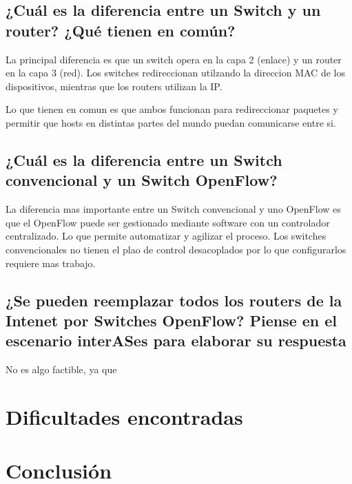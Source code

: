 \documentclass{article}
\begin{document}
\subsection{\texorpdfstring{\textbf{¿Cuál es la diferencia entre un Switch y un router? ¿Qué tienen en común?}}{1. ¿Cuál es la diferencia entre un Switch y un router? ¿Qué tienen en común?}}\label{describa-la-arquitectura-cliente-servidor.}

La principal diferencia es que un switch opera en la capa 2 (enlace) y un router en la capa 3 (red).
Los switches redireccionan utilzando la direccion MAC de los dispositivos, mientras que los
routers utilizan la IP.

Lo que tienen en comun es que ambos funcionan para redireccionar paquetes y permitir
que hosts en distintas partes del mundo puedan comunicarse entre si.

\subsection{\texorpdfstring{\textbf{¿Cuál es la diferencia entre un Switch convencional y un Switch OpenFlow?}}{¿Cuál es la diferencia entre un Switch convencional y un Switch OpenFlow?}}\label{detalle-el-protocolo-de-aplicaciuxf3n-desarrollado-en-este-trabajo.}

La diferencia mas importante entre un Switch convencional y uno OpenFlow es que el OpenFlow puede
ser gestionado mediante software con un controlador centralizado. Lo que permite automatizar
y agilizar el proceso.
Los switches convencionales no tienen el plao de control desacoplados por lo que configurarlos
requiere mas trabajo.

\subsection{\texorpdfstring{\textbf{¿Se pueden reemplazar todos los routers de la Intenet por Switches OpenFlow? Piense en el escenario interASes para elaborar su respuesta}}{¿Se pueden reemplazar todos los routers de la Intenet por Switches OpenFlow? Piense en el escenario interASes para elaborar su respuesta}}\label{la-capa-de-transporte-del-stack-tcpip-ofrece-dos-protocolos-tcp-y-udp.-quuxe9-servicios-proveen-dichos-protocolos-cuuxe1les-son-sus-caracteruxedsticas-cuuxe1ndo-es-apropiado-utilizar-cada-uno}

No es algo factible, ya que

\section{\texorpdfstring{\textbf{Dificultades
encontradas}}{Dificultades encontradas}}\label{dificultades-encontradas}

\section{\texorpdfstring{\textbf{Conclusión}}{Conclusión}}\label{conclusiuxf3n-wip}
\end{document}

